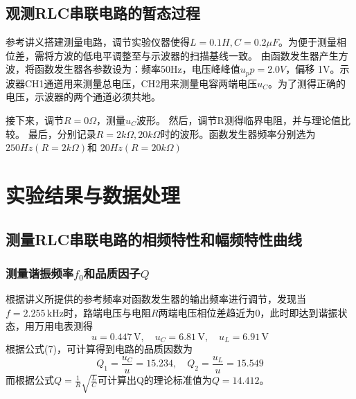 \documentclass[UTF-8,twoside,cs4size]{ctexart}
\begin{document}
    \subsection{观测RLC串联电路的暂态过程}
    参考讲义搭建测量电路，调节实验仪器使得$L=0.1H,C=0.2\mu F$。为便于测量相位差，需将方波的低电平调整至与示波器的扫描基线一致。
    由函数发生器产生方波，将函数发生器各参数设为：频率50Hz，电压峰峰值$u_pp=2.0V$，偏移
    1V。示波器CH1通道用来测量总电压，CH2用来测量电容两端电压$u_C$。为了测得正确的电压，示波器的两个通道必须共地。

    接下来，调节$R=0\Omega$，测量$u_C$波形。
    然后，调节R测得临界电阻，并与理论值比较。
    最后，分别记录$R=2k\Omega,20k\Omega$时的波形。函数发生器频率分别选为$250Hz(R=2k\Omega)$和
    $20Hz(R=20k\Omega)$

\section{实验结果与数据处理}
    \subsection{测量RLC串联电路的相频特性和幅频特性曲线}
        \subsubsection{测量谐振频率$f_0$和品质因子$Q$}
            根据讲义所提供的参考频率对函数发生器的输出频率进行调节，发现当$ f=2.255\,\mathrm{kHz} $时，路端电压与电阻$ R $两端电压相位差趋近为0，此时即达到谐振状态，用万用电表测得
            \[u=0.447\,\mathrm V,\quad u_C=6.81\,\mathrm{V},\quad u_L=6.91\,\mathrm V\]
            根据公式(7)，可计算得到电路的品质因数为
            \[Q_1=\frac{u_C}{u}=15.234,\quad Q_2=\frac{u_L}{u}=15.549\]
            而根据公式$Q = \frac{1}{R}\sqrt{\frac{L}{C}}$可计算出Q的理论标准值为$Q = 14.412$。
\end{document}
